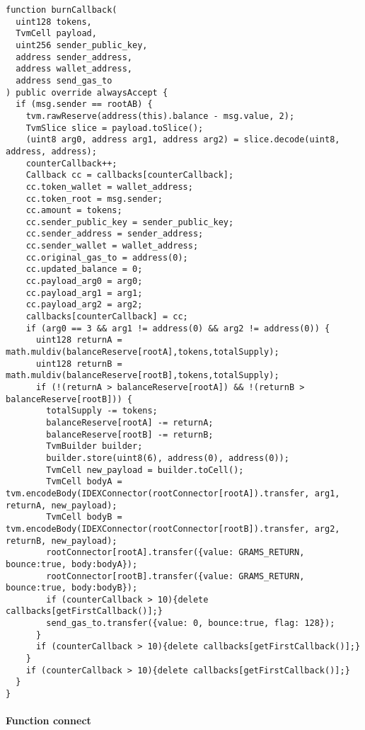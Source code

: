 \begin{lstlisting}[firstnumber=522]
function burnCallback(
  uint128 tokens,
  TvmCell payload,
  uint256 sender_public_key,
  address sender_address,
  address wallet_address,
  address send_gas_to
) public override alwaysAccept {
  if (msg.sender == rootAB) {
    tvm.rawReserve(address(this).balance - msg.value, 2);
    TvmSlice slice = payload.toSlice();
    (uint8 arg0, address arg1, address arg2) = slice.decode(uint8, address, address);
    counterCallback++;
    Callback cc = callbacks[counterCallback];
    cc.token_wallet = wallet_address;
    cc.token_root = msg.sender;
    cc.amount = tokens;
    cc.sender_public_key = sender_public_key;
    cc.sender_address = sender_address;
    cc.sender_wallet = wallet_address;
    cc.original_gas_to = address(0);
    cc.updated_balance = 0;
    cc.payload_arg0 = arg0;
    cc.payload_arg1 = arg1;
    cc.payload_arg2 = arg2;
    callbacks[counterCallback] = cc;
    if (arg0 == 3 && arg1 != address(0) && arg2 != address(0)) {
      uint128 returnA = math.muldiv(balanceReserve[rootA],tokens,totalSupply);
      uint128 returnB = math.muldiv(balanceReserve[rootB],tokens,totalSupply);
      if (!(returnA > balanceReserve[rootA]) && !(returnB > balanceReserve[rootB])) {
        totalSupply -= tokens;
        balanceReserve[rootA] -= returnA;
        balanceReserve[rootB] -= returnB;
        TvmBuilder builder;
        builder.store(uint8(6), address(0), address(0));
        TvmCell new_payload = builder.toCell();
        TvmCell bodyA = tvm.encodeBody(IDEXConnector(rootConnector[rootA]).transfer, arg1, returnA, new_payload);
        TvmCell bodyB = tvm.encodeBody(IDEXConnector(rootConnector[rootB]).transfer, arg2, returnB, new_payload);
        rootConnector[rootA].transfer({value: GRAMS_RETURN, bounce:true, body:bodyA});
        rootConnector[rootB].transfer({value: GRAMS_RETURN, bounce:true, body:bodyB});
        if (counterCallback > 10){delete callbacks[getFirstCallback()];}
        send_gas_to.transfer({value: 0, bounce:true, flag: 128});
      }
      if (counterCallback > 10){delete callbacks[getFirstCallback()];}
    }
    if (counterCallback > 10){delete callbacks[getFirstCallback()];}
  }
}
\end{lstlisting}

\paragraph{Function connect}

\vspace{2cm}

